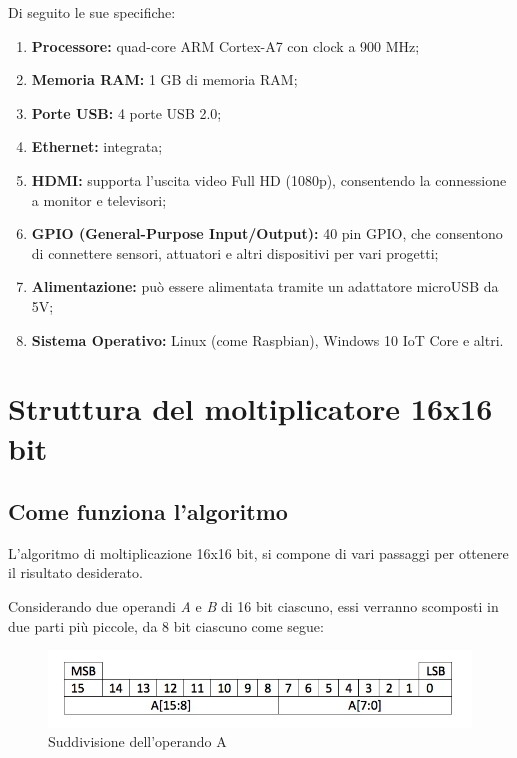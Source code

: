 \documentclass[titlepage]{report}
\begin{document}
		Di seguito le sue specifiche:
		
		\begin{enumerate}
			\item \textbf{Processore:} quad-core ARM Cortex-A7 con clock a 900 MHz;
			
			\item \textbf{Memoria RAM:}  1 GB di memoria RAM;
			\item \textbf{Porte USB:}  4 porte USB 2.0;
			
			\item \textbf{Ethernet:} integrata;
			\item \textbf{HDMI:} supporta l'uscita video Full HD (1080p), consentendo la connessione a monitor e televisori;
			
			\item \textbf{GPIO (General-Purpose Input/Output):} 40 pin GPIO, che consentono di connettere sensori, attuatori e altri dispositivi per vari progetti;
			
			\item \textbf{Alimentazione:} può essere alimentata tramite un adattatore microUSB da 5V;
			
			\item \textbf{Sistema Operativo:}  Linux (come Raspbian), Windows 10 IoT Core e altri.

		\end{enumerate}


\chapter*{Struttura del moltiplicatore 16x16 bit}
\label{ch:struttura_moltiplicatore}

	\section*{Come funziona l'algoritmo}
	\label{sec:how_it_works}
		L'algoritmo di moltiplicazione 16x16 bit, si compone di vari passaggi per ottenere il risultato desiderato.
		
		Considerando due operandi \textit{A} e \textit{B} di 16 bit ciascuno, essi verranno scomposti in due parti più piccole, da 8 bit ciascuno come segue: 

		\begin{figure}[ht]
			\centering
			\includegraphics[scale=0.4]{./img/operand-16-bit.jpeg}
			\caption{Suddivisione dell'operando A}
			\label{fig:operando_a}
		\end{figure}
\end{document}
